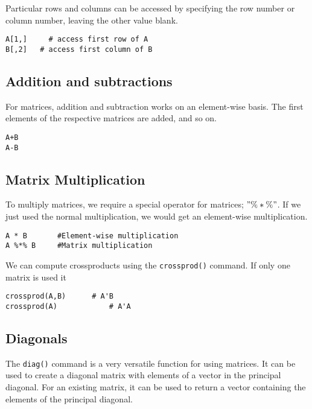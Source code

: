\documentclass[a4paper,12pt]{article}
\begin{document}
\begin{itemize}
Particular rows and columns can be accessed by specifying the row number or column number, leaving the other value blank.
\begin{framed}
\begin{verbatim}
A[1,]	  # access first row of A
B[,2]   # access first column of B
\end{verbatim}
\end{framed}
\newpage
\subsection{Addition and subtractions}
For matrices, addition and subtraction works on an element-wise basis. The first elements of the respective matrices are added, and so on.
\begin{framed}
\begin{verbatim}
A+B
A-B
\end{verbatim}
\end{framed}

\subsection{Matrix Multiplication}
To multiply matrices, we require a special operator for matrices; $"\%*\%"$.
If we just used the normal multiplication, we would get an element-wise multiplication.
\begin{framed}
\begin{verbatim}
A * B  		#Element-wise multiplication
A %*% B  	#Matrix multiplication
\end{verbatim}
\end{framed}

We can compute crossproducts using the \texttt{crossprod()} command. If only one matrix is used it
\begin{verbatim}
crossprod(A,B) 		# A'B
crossprod(A) 			# A'A
\end{verbatim}
\newpage
\subsection{Diagonals}
The \texttt{diag()} command is a very versatile function for using matrices.
It can be used to create a diagonal matrix with elements of a vector in the principal diagonal. For an existing matrix, it can be used to return a vector containing the elements of the principal diagonal.



\end{itemize}
\end{document}
